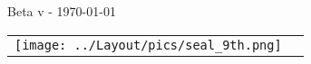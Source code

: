 
\setlength{\arrayrulewidth}{2pt}
\renewcommand{\arraystretch}{1.2}

\begin{titlepage}
\begin{center}

\ifdef{\booktitle}{}{\newcommand{\booktitle}{Missing title}}
\ifdef{\version}{}{\newcommand{\version}{Missing version}}

{\antiquefont\fontsize{40}{48}\selectfont\noindent{}

}

\vspace*{0.5cm}

\vspace*{-1cm}
{\antiquefont\fontsize{50}{60}\selectfont \booktitle
\vspace{0.4cm}

\fontsize{14}{16.8}\selectfont {}

Beta v\version{} - \today{}}

\vfill

\begin{tabular}{@{}m{2cm}@{\hskip 20pt}m{13cm}@{}}
\texttt{[image: ../Layout/pics/seal\_9th.png]} &
{\fontsize{10}{12}\selectfont \textcolor{black!50}{\noindent{}}}

\ifdef{\frontpageaddstuff}{{\fontsize{10}{12}\selectfont \noindent\textcolor{black!50}{\frontpageaddstuff}}}{}

\vspace*{10pt}
\noindent{\fontsize{10}{12}\selectfont \textcolor{black!50}{\labels@license}}
\tabularnewline
\end{tabular}


\end{center}

\newpage

\thispagestyle{empty}

{\fontsize{10}{12}\selectfont

\vfill

\noindent{}

\bigskip
\noindent {}
}


\end{titlepage}

\restoregeometry